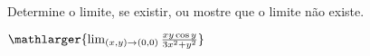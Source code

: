 Determine o limite, se existir, ou mostre que o limite não existe.

$\mathlarger{\lim_{(x,y)\rightarrow(0,0)} \frac{xy\cos y}{3x^2 + y^2}}$

